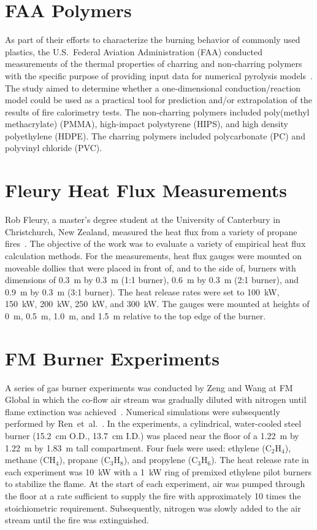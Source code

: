 \section{FAA Polymers}
\label{FAA_Polymers_Description}

As part of their efforts to characterize the burning behavior of commonly used plastics, the U.S.~Federal Aviation Administration (FAA) conducted measurements of the thermal properties of charring and non-charring polymers with the specific purpose of providing input data for numerical pyrolysis models~\cite{Stoliarov:CF2009,Stoliarov:CF2010}. The study aimed to determine whether a one-dimensional conduction/reaction model could be used as a practical tool for prediction and/or extrapolation of the results of fire calorimetry tests. The non-charring polymers included poly(methyl methacrylate) (PMMA), high-impact polystyrene (HIPS), and high density polyethylene (HDPE). The charring polymers included polycarbonate (PC) and polyvinyl chloride (PVC).


\section{Fleury Heat Flux Measurements}
\label{Fleury_Heat_Flux_Description}

Rob Fleury, a master's degree student at the University of Canterbury in Christchurch, New Zealand, measured the heat flux from a variety of propane fires~\cite{Fleury:Masters}. The objective of the work was to evaluate a variety of empirical heat flux calculation methods. For the measurements, heat flux gauges were mounted on moveable dollies that were placed in front of, and to the side of, burners with dimensions of 0.3~m by 0.3~m (1:1 burner), 0.6~m by 0.3~m (2:1 burner), and 0.9~m by 0.3~m (3:1 burner). The heat release rates were set to 100~kW, 150~kW, 200~kW, 250~kW, and 300~kW. The gauges were mounted at heights of 0~m, 0.5~m, 1.0~m, and 1.5~m relative to the top edge of the burner.


\section{FM Burner Experiments}
\label{FM_Burner_Description}

A series of gas burner experiments was conducted by Zeng and Wang at FM Global in which the co-flow air stream was gradually diluted with nitrogen until flame extinction was achieved~\cite{Zeng:26ICDERS}. Numerical simulations were subsequently performed by Ren~et~al.~\cite{Ren:CS2018}. In the experiments, a cylindrical, water-cooled steel burner (15.2~cm O.D., 13.7~cm I.D.) was placed near the floor of a 1.22~m by 1.22~m by 1.83~m tall compartment. Four fuels were used: ethylene (C$_2$H$_4$), methane (CH$_4$), propane (C$_3$H$_8$), and propylene (C$_3$H$_6$). The heat release rate in each experiment was 10~kW with a 1~kW ring of premixed ethylene pilot burners to stabilize the flame. At the start of each experiment, air was pumped through the floor at a rate sufficient to supply the fire with approximately 10 times the stoichiometric requirement. Subsequently, nitrogen was slowly added to the air stream until the fire was extinguished.

